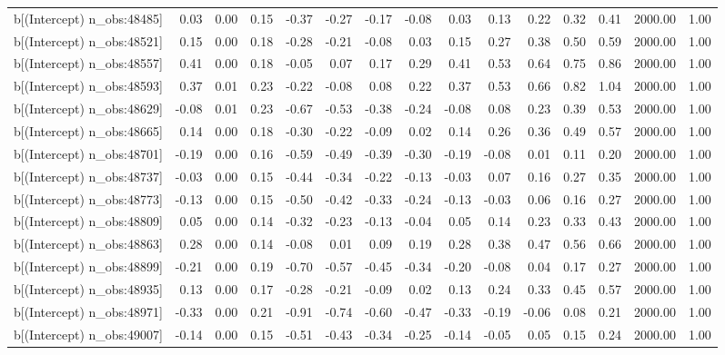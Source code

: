 \begin{table}[ht]
\begin{tabular}{rrrrrrrrrrrrrrr}
  b[(Intercept) n\_obs:48485] & 0.03 & 0.00 & 0.15 & -0.37 & -0.27 & -0.17 & -0.08 & 0.03 & 0.13 & 0.22 & 0.32 & 0.41 & 2000.00 & 1.00 \\ 
  b[(Intercept) n\_obs:48521] & 0.15 & 0.00 & 0.18 & -0.28 & -0.21 & -0.08 & 0.03 & 0.15 & 0.27 & 0.38 & 0.50 & 0.59 & 2000.00 & 1.00 \\ 
  b[(Intercept) n\_obs:48557] & 0.41 & 0.00 & 0.18 & -0.05 & 0.07 & 0.17 & 0.29 & 0.41 & 0.53 & 0.64 & 0.75 & 0.86 & 2000.00 & 1.00 \\ 
  b[(Intercept) n\_obs:48593] & 0.37 & 0.01 & 0.23 & -0.22 & -0.08 & 0.08 & 0.22 & 0.37 & 0.53 & 0.66 & 0.82 & 1.04 & 2000.00 & 1.00 \\ 
  b[(Intercept) n\_obs:48629] & -0.08 & 0.01 & 0.23 & -0.67 & -0.53 & -0.38 & -0.24 & -0.08 & 0.08 & 0.23 & 0.39 & 0.53 & 2000.00 & 1.00 \\ 
  b[(Intercept) n\_obs:48665] & 0.14 & 0.00 & 0.18 & -0.30 & -0.22 & -0.09 & 0.02 & 0.14 & 0.26 & 0.36 & 0.49 & 0.57 & 2000.00 & 1.00 \\ 
  b[(Intercept) n\_obs:48701] & -0.19 & 0.00 & 0.16 & -0.59 & -0.49 & -0.39 & -0.30 & -0.19 & -0.08 & 0.01 & 0.11 & 0.20 & 2000.00 & 1.00 \\ 
  b[(Intercept) n\_obs:48737] & -0.03 & 0.00 & 0.15 & -0.44 & -0.34 & -0.22 & -0.13 & -0.03 & 0.07 & 0.16 & 0.27 & 0.35 & 2000.00 & 1.00 \\ 
  b[(Intercept) n\_obs:48773] & -0.13 & 0.00 & 0.15 & -0.50 & -0.42 & -0.33 & -0.24 & -0.13 & -0.03 & 0.06 & 0.16 & 0.27 & 2000.00 & 1.00 \\ 
  b[(Intercept) n\_obs:48809] & 0.05 & 0.00 & 0.14 & -0.32 & -0.23 & -0.13 & -0.04 & 0.05 & 0.14 & 0.23 & 0.33 & 0.43 & 2000.00 & 1.00 \\ 
  b[(Intercept) n\_obs:48863] & 0.28 & 0.00 & 0.14 & -0.08 & 0.01 & 0.09 & 0.19 & 0.28 & 0.38 & 0.47 & 0.56 & 0.66 & 2000.00 & 1.00 \\ 
  b[(Intercept) n\_obs:48899] & -0.21 & 0.00 & 0.19 & -0.70 & -0.57 & -0.45 & -0.34 & -0.20 & -0.08 & 0.04 & 0.17 & 0.27 & 2000.00 & 1.00 \\ 
  b[(Intercept) n\_obs:48935] & 0.13 & 0.00 & 0.17 & -0.28 & -0.21 & -0.09 & 0.02 & 0.13 & 0.24 & 0.33 & 0.45 & 0.57 & 2000.00 & 1.00 \\ 
  b[(Intercept) n\_obs:48971] & -0.33 & 0.00 & 0.21 & -0.91 & -0.74 & -0.60 & -0.47 & -0.33 & -0.19 & -0.06 & 0.08 & 0.21 & 2000.00 & 1.00 \\ 
  b[(Intercept) n\_obs:49007] & -0.14 & 0.00 & 0.15 & -0.51 & -0.43 & -0.34 & -0.25 & -0.14 & -0.05 & 0.05 & 0.15 & 0.24 & 2000.00 & 1.00 \\ 

\end{tabular}
\end{table}
